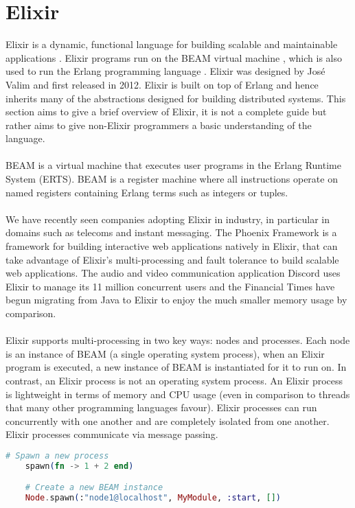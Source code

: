 \section{Elixir}
Elixir is a dynamic, functional language for building scalable and maintainable applications \cite{elixir}. Elixir programs run on the BEAM virtual machine \cite{beam}, which is also used to run the Erlang programming language \cite{erlang}. Elixir was designed by José Valim and first released in 2012. Elixir is built on top of Erlang and hence inherits many of the abstractions designed for building distributed systems. This section aims to give a brief overview of Elixir, it is not a complete guide but rather aims to give non-Elixir programmers a basic understanding of the language.
\\ \\
BEAM is a virtual machine that executes user programs in the Erlang Runtime System (ERTS). BEAM is a register machine where all instructions operate on named registers containing Erlang terms such as integers or tuples.
\\ \\
We have recently seen companies adopting Elixir in industry, in particular in domains such as telecoms and instant messaging. The Phoenix Framework \cite{phoenix} is a framework for building interactive web applications natively in Elixir, that can take advantage of Elixir's multi-processing and fault tolerance to build scalable web applications. The audio and video communication application Discord \cite{discord} uses Elixir to manage its 11 million concurrent users and the Financial Times \cite{ft} have begun migrating from Java to Elixir to enjoy the much smaller memory usage by comparison.
\\ \\
Elixir supports multi-processing in two key ways: nodes and processes. Each node is an instance of BEAM (a single operating system process), when an Elixir program is executed, a new instance of BEAM is instantiated for it to run on. In contrast, an Elixir process is not an operating system process. An Elixir process is lightweight in terms of memory and CPU usage (even in comparison to threads that many other programming languages favour). Elixir processes can run concurrently with one another and are completely isolated from one another. Elixir processes communicate via message passing.
\begin{lstlisting}[language=Elixir, xleftmargin=.2\linewidth, caption={An example of spawn/1 and spawn/4 in Elixir for spawning a new lightweight process and a new Elixir node}]
    # Spawn a new process
    spawn(fn -> 1 + 2 end)

    # Create a new BEAM instance
    Node.spawn(:"node1@localhost", MyModule, :start, [])
\end{lstlisting}

